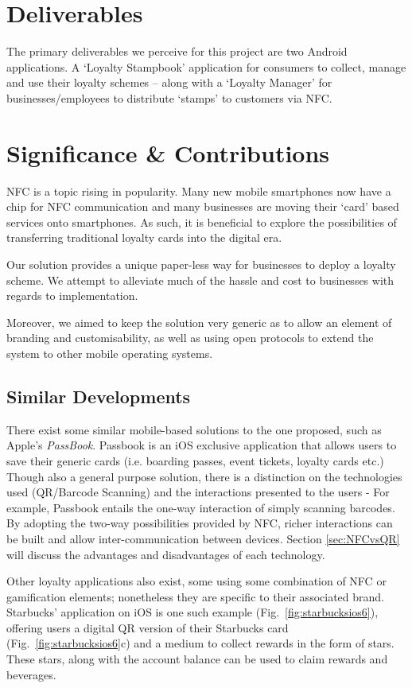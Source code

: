 \section{Deliverables}
The primary deliverables we perceive for this project are two Android applications. A `Loyalty Stampbook' application for consumers to collect, manage and use their loyalty schemes -- along with a `Loyalty Manager' for businesses/employees to distribute `stamps' to customers via NFC.  

\section{Significance \& Contributions}
NFC is a topic rising in popularity. Many new mobile smartphones now have a chip for NFC communication and many businesses are moving their `card' based services onto smartphones. As such, it is beneficial to explore the possibilities of transferring traditional loyalty cards into the digital era. 

Our solution provides a unique paper-less way for businesses to deploy a loyalty scheme. We attempt to alleviate much of the hassle and cost to businesses with regards to implementation.

Moreover, we aimed to keep the solution very generic as to allow an element of branding and customisability, as well as using open protocols to extend the system to other mobile operating systems.   

\subsection{Similar Developments}
There exist some similar mobile-based solutions to the one proposed, such as Apple's \emph{PassBook}. Passbook is an iOS exclusive application that allows users to save their generic cards (i.e. boarding passes, event tickets, loyalty cards etc.) Though also a general purpose solution, there is a distinction on the technologies used (QR/Barcode Scanning) and the interactions presented to the users - For example, Passbook entails the one-way interaction of simply scanning barcodes. By adopting the two-way possibilities provided by NFC, richer interactions can be built and allow inter-communication between devices. Section \ref{sec:NFCvsQR} will discuss the advantages and disadvantages of each technology.

Other loyalty applications also exist, some using some combination of NFC or gamification elements; nonetheless they are specific to their associated brand. Starbucks' application on iOS is one such example (Fig.~\ref{fig:starbucksios6}), offering users a digital QR version of their Starbucks card (Fig.~\ref{fig:starbucksios6}c) and a medium to collect rewards in the form of stars. These stars, along with the account balance can be used to claim rewards and beverages.

